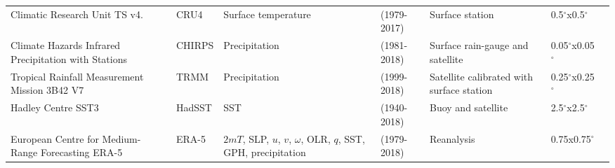 \begin{sidewaystable}
\begin{tabular}{p{4.5cm}|p{1.47cm}p{3.2cm}p{2.12cm}p{}p{2.12cm}p{3.24cm}}
Climatic Research Unit TS  v4.     & CRU4         & Surface temperature  & (1979-2017)       &  Surface station    &  0.5$^\circ$x0.5$^\circ$   &        \citep{harris2014}                            \\
  Climate Hazards Infrared Precipitation with Stations   & CHIRPS          & Precipitation       & (1981-2018)       &  Surface rain-gauge and satellite               &  0.05$^\circ$x0.05$^\circ$ & \citep{funk2015}              \\
Tropical Rainfall Measurement Mission 3B42 V7       & TRMM          & Precipitation       & (1999-2018)   & Satellite calibrated with surface station   & 0.25$^\circ$x0.25$^\circ$  &  \citep{mission2011} \\
Hadley Centre SST3                           & HadSST          & SST               & (1940-2018)   & Buoy and satellite              & 2.5$^\circ$x2.5$^\circ$  &  \citep{kennedy2011} \\
European Centre for Medium-Range Forecasting ERA-5                            & ERA-5             & $2mT$, SLP, $u$, $v$, $\omega$, OLR, $q$, SST, GPH, precipitation    &  (1979-2018)    &  Reanalysis       & 0.75x0.75$^\circ$ &  \citep{era5,era5hersbach}
\end{tabular}

\end{sidewaystable}


